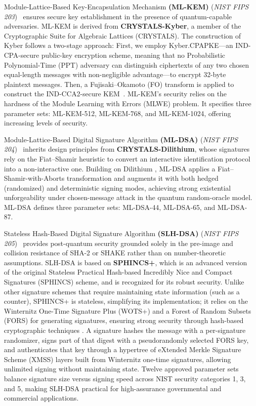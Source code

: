 \documentclass[10pt,journal]{IEEEtran}%
\begin{document}
Module-Lattice-Based Key-Encapsulation Mechanism \textbf{(ML-KEM)} (\emph{NIST FIPS 203})~\cite{NIST_FIPS_203_2024} ensures secure key establishment in the presence of quantum-capable adversaries. ML-KEM is derived from \textbf{CRYSTALS-Kyber}, a member of the Cryptographic Suite for Algebraic Lattices (CRYSTALS). The construction of Kyber follows a two-stage approach: First, we employ Kyber.CPAPKE—an IND-CPA-secure public-key encryption scheme, meaning that no Probabilistic Polynomial-Time (PPT) adversary can distinguish ciphertexts of any two chosen equal-length messages with non-negligible advantage—to encrypt 32-byte plaintext messages. Then, a Fujisaki–Okamoto (FO) transform is applied to construct the IND-CCA2-secure KEM~\cite{avanzi2019crystals}. ML-KEM's security relies on the hardness of the Module Learning with Errors (MLWE) problem. It specifies three parameter sets: ML-KEM-512, ML-KEM-768, and ML-KEM-1024, offering increasing levels of security. 

Module-Lattice-Based Digital Signature Algorithm \textbf{(ML-DSA)} (\emph{NIST FIPS 204})~\cite{NIST_FIPS_204_2024}  inherits design principles from \textbf{CRYSTALS-Dilithium}, whose signatures rely on the Fiat–Shamir heuristic to convert an interactive identification protocol into a non-interactive one. Building on Dilithium \cite{bai2021crystals}, ML-DSA applies a Fiat–Shamir-with-Aborts transformation and augments it with both hedged (randomized) and deterministic signing modes, achieving strong existential unforgeability under chosen-message attack in the quantum random-oracle model. ML-DSA defines three parameter sets: ML-DSA-44, ML-DSA-65, and ML-DSA-87.


Stateless Hash-Based Digital Signature Algorithm \textbf{(SLH-DSA)} (\emph{NIST FIPS 205})~\cite{NIST_FIPS_205_2024} provides post-quantum security grounded solely in the pre-image and collision resistance of SHA-2 or SHAKE rather than on number-theoretic assumptions.
SLH-DSA is based on \textbf{SPHINCS+}, which is an advanced version of the original Stateless Practical Hash-based Incredibly Nice and Compact Signatures (SPHINCS) scheme, and is recognized for its robust security. Unlike other signature schemes that require maintaining state information (such as a counter), SPHINCS+ is stateless, simplifying its implementation; it relies on the Winternitz One-Time Signature Plus (WOTS+) and a Forest of Random Subsets (FORS) for generating signatures, ensuring strong security through hash-based cryptographic techniques \cite{bernstein2019sphincs+}. A signature hashes the message with a per-signature randomizer, signs part of that digest with a pseudorandomly selected FORS key, and authenticates that key through a hypertree of eXtended Merkle Signature Scheme (XMSS) layers built from Winternitz one-time signatures, allowing unlimited signing without maintaining state. Twelve approved parameter sets balance signature size versus signing speed across NIST security categories 1, 3, and 5, making SLH-DSA practical for high-assurance governmental and commercial applications.  
\end{document}
